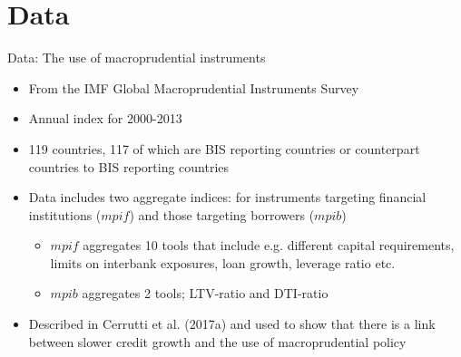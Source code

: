\documentclass{beamer}
\begin{document}
\section{Data}


\begin{frame}{Data: The use of macroprudential instruments}
\begin{itemize}
\item From the IMF Global Macroprudential Instruments Survey
\item Annual index for 2000-2013
\item 119 countries, 117 of which are BIS reporting countries or counterpart countries to BIS reporting countries 
\item Data includes two aggregate indices: for instruments targeting financial institutions ($mpif$) and those targeting borrowers ($mpib$)
\begin{itemize}
\item $mpif$ aggregates 10 tools that include e.g. different capital requirements, limits on interbank exposures, loan growth, leverage ratio etc.
\item $mpib$ aggregates 2 tools; LTV-ratio and DTI-ratio
\end{itemize}
\item Described in Cerrutti et al. (2017a) and used to show that there is a link between slower credit growth and the use of macroprudential policy
\end{itemize}
\end{frame}
\end{document}

